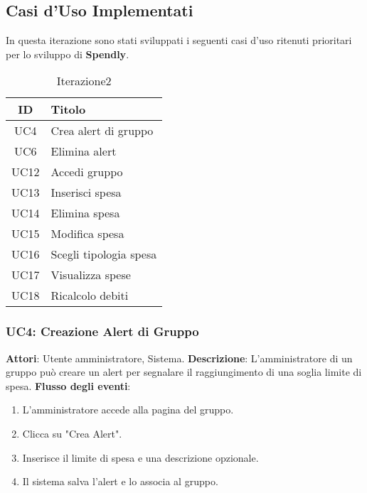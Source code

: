 \subsection{Casi d'Uso Implementati }

In questa iterazione sono stati sviluppati i seguenti casi d’uso ritenuti prioritari per lo sviluppo di \textbf{Spendly}.

\begin{table}[h]
    \centering
    \begin{tabular}{|c|l|}
    \hline
    \textbf{ID} & \textbf{Titolo} \\ \hline
    UC4  & Crea alert di gruppo \\ \hline
    UC6  & Elimina alert \\ \hline
    UC12 & Accedi gruppo \\ \hline
    UC13 & Inserisci spesa \\ \hline
    UC14 & Elimina spesa \\ \hline
    UC15 & Modifica spesa \\ \hline
    UC16 & Scegli tipologia spesa \\ \hline
    UC17 & Visualizza spese \\ \hline
    UC18 & Ricalcolo debiti \\ \hline
    \end{tabular}
    \caption{Iterazione2}
\end{table}

\subsubsection{UC4: Creazione Alert di Gruppo}
\textbf{Attori}: Utente amministratore, Sistema.
\newline
\newline
\textbf{Descrizione}: L’amministratore di un gruppo può creare un alert per segnalare il raggiungimento di una soglia limite di spesa.
\newline
\newline
\textbf{Flusso degli eventi}:
\begin{enumerate}
    \item L’amministratore accede alla pagina del gruppo.
    \item Clicca su "Crea Alert".
    \item Inserisce il limite di spesa e una descrizione opzionale.
    \item Il sistema salva l’alert e lo associa al gruppo.
\end{enumerate}

